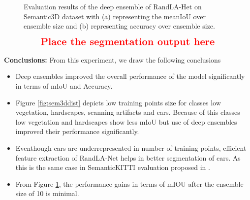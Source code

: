     \begin{figure}[htbp]
        \begin{subfigure}{0.495\textwidth}
            
            \caption{}
            \label{fig:meaniou_de}   
        \end{subfigure}
        \begin{subfigure}{0.495\textwidth}
            
            \caption{}
            \label{fig:acc_de}
        \end{subfigure}
        \caption{Evaluation results of the deep ensemble of RandLA-Het on Semantic3D dataset with (a) representing the meanIoU over ensemble size and (b) representing accuracy over ensemble size.}
    \end{figure}

 

    $$
    \text{\centering \Large\textbf{\textcolor{red}{Place the segmentation output here}}}
    $$
    
    \textbf{Conclusions:}
    From this experiment, we draw the following conclusions 
    \begin{itemize}
        \item Deep ensembles improved the overall performance of the model significantly in terms of mIoU and Accuracy.
        \item Figure \ref{fig:sem3ddist} depicts low training points size for classes low vegetation, hardscapes, scanning artifacts and cars. Because of this classes low vegetation and hardscapes show less mIoU but use of deep ensembles improved their performance significantly.
        \item Eventhough cars are underrepresented in number of training points, efficient feature extraction of RandLA-Net helps in better segmentation of cars. As this is the same case in SemanticKITTI evaluation proposed in \cite{Hu_2020_CVPR_Randla}.
        \item From Figure \ref{fig:meaniou_de}, the performance gains in terms of mIOU after the ensemble size of 10 is minimal.
    \end{itemize}

